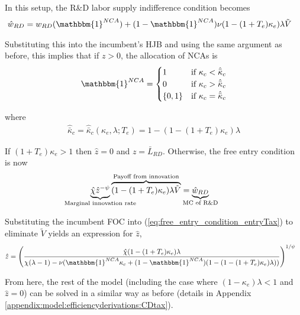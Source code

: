 \documentclass[11pt,english]{article}
\begin{document}
In this setup, the R\&D labor supply indifference condition becomes
\begin{align}
\hat{w}_{RD} &= w_{RD}(\mathbbm{1}^{NCA}) + (1-\mathbbm{1}^{NCA}) \nu (1-(1+T_e)\kappa_e) \lambda \tilde{V} \label{eq:RD_worker_indifference_entryTax}
\end{align}

Substituting this into the incumbent's HJB and using the same argument as before, this implies that if $z > 0$, the allocation of NCAs is 
\begin{align}
\mathbbm{1}^{NCA} = \begin{cases}
1 & \textrm{if } \kappa_{c} < \hat{\bar{\kappa}}_c  \\
0 & \textrm{if } \kappa_{c} > \hat{\bar{\kappa}}_c \\
\{0,1\} & \textrm{if } \kappa_c = \hat{\bar{\kappa}}_c 
\end{cases} \label{eq:nca_policy_entryTax}
\end{align}

where
\begin{align}
\hat{\bar{\kappa}}_c = \hat{\bar{\kappa}}_c(\kappa_e,\lambda;T_e) = 1 - (1-(1+T_e)\kappa_e)\lambda  \label{eq:barkappa_entryTax}
\end{align}

If $(1 + T_e) \kappa_e > 1$ then $\hat{z} = 0$ and $z = \bar{L}_{RD}$. Otherwise, the free entry condition is now
\begin{align}
\underbrace{\hat{\chi} \hat{z}^{-\psi}}_{\mathclap{\text{Marginal innovation rate}}} \overbrace{(1-(1+T_e)\kappa_e) \lambda \tilde{V}}^{\mathclap{\text{Payoff from innovation}}} &= \underbrace{\hat{w}_{RD}}_{\mathclap{\text{MC of R\&D}}} \label{eq:free_entry_condition_entryTax}
\end{align}

Substituting the incumbent FOC into (\ref{eq:free_entry_condition_entryTax}) to eliminate $\tilde{V}$ yields an expression for $\hat{z}$, 
\begin{align}
\hat{z} &= \Bigg( \frac{\hat{\chi} (1-(1+T_e)\kappa_{e}) \lambda}{\chi(\lambda -1) - \nu (\mathbbm{1}^{NCA}\kappa_c + (1-\mathbbm{1}^{NCA})(1 - (1-(1+T_e)\kappa_e)\lambda)) } \Bigg)^{1/\psi} \label{eq:effort_entrant_entryTax}
\end{align}

From here, the rest of the model (including the case where $(1-\kappa_e)\lambda < 1$ and $\hat{z} = 0$) can be solved in a similar way as before (details in Appendix \ref{appendix:model:efficiencyderivations:CDtax}). 
\end{document}
